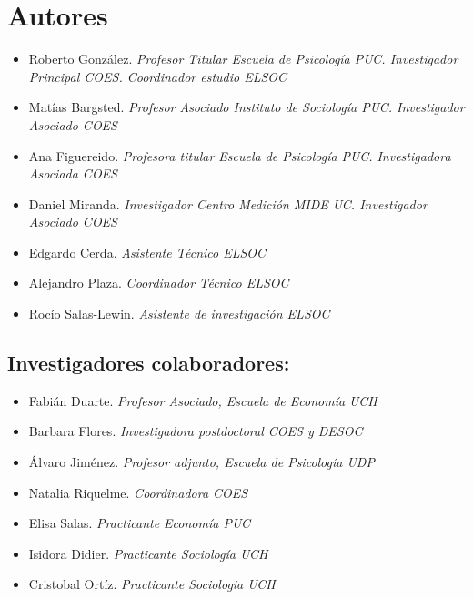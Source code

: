 \documentclass[
  12pt,
]{book}
\providecommand{\tightlist}{%
  \setlength{\itemsep}{0pt}\setlength{\parskip}{0pt}}
\begin{document}
\hypertarget{autores}{%
\section*{Autores}\label{autores}}

\begin{itemize}
\tightlist
\item
  Roberto González. \emph{Profesor Titular Escuela de Psicología PUC. Investigador Principal COES. Coordinador estudio ELSOC}
\item
  Matías Bargsted. \emph{Profesor Asociado Instituto de Sociología PUC. Investigador Asociado COES}
\item
  Ana Figuereido. \emph{Profesora titular Escuela de Psicología PUC. Investigadora Asociada COES}
\item
  Daniel Miranda. \emph{Investigador Centro Medición MIDE UC. Investigador Asociado COES}
\item
  Edgardo Cerda. \emph{Asistente Técnico ELSOC}
\item
  Alejandro Plaza. \emph{Coordinador Técnico ELSOC}
\item
  Rocío Salas-Lewin. \emph{Asistente de investigación ELSOC}
\end{itemize}

\hypertarget{investigadores-colaboradores}{%
\subsection*{Investigadores colaboradores:}\label{investigadores-colaboradores}}

\begin{itemize}
\tightlist
\item
  Fabián Duarte. \emph{Profesor Asociado, Escuela de Economía UCH}
\item
  Barbara Flores. \emph{Investigadora postdoctoral COES y DESOC}
\item
  Álvaro Jiménez. \emph{Profesor adjunto, Escuela de Psicología UDP}
\item
  Natalia Riquelme. \emph{Coordinadora COES}
\item
  Elisa Salas. \emph{Practicante Economía PUC}
\item
  Isidora Didier. \emph{Practicante Sociología UCH}
\item
  Cristobal Ortíz. \emph{Practicante Sociologia UCH}
\end{itemize}
\end{document}

